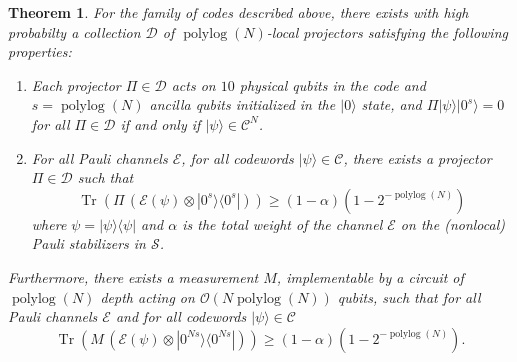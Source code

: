 \documentclass[11pt,letterpaper]{article}
\newtheorem{theorem}{Theorem}[section]
\theoremstyle{definition}
\theoremstyle{remark}
\newcommand{\Paren}[1]{\left(#1\right)}
\DeclareMathOperator{\Tr}{Tr}
\DeclareMathOperator{\polylog}{polylog}
\newcommand{\cC}{\mathcal C}
\newcommand{\cD}{\mathcal D}
\newcommand{\cE}{\mathcal E}
\newcommand{\cS}{\mathcal S}
\renewcommand{\geq}{\geqslant}
\numberwithin{equation}{section}
\theoremstyle{definition}
\newcommand{\ket}[1]{|#1\rangle}
\newcommand{\ketbra}[2]{|#1\rangle\! \langle #2|}
\begin{document}
\begin{theorem}
\label{thm:local_detection}
  For the family of codes described above, there exists with high probabilty a collection $\cD$ of $\polylog(N)$-local projectors satisfying the following properties:
  \begin{enumerate}
    \item Each projector $\Pi \in \cD$ acts on $10$ physical qubits in the code and $s = \polylog(N)$ ancilla qubits initialized in the $\ket{0}$ state, and $\Pi \ket{\psi} \ket{0^s} = 0$ for all $\Pi \in \cD$ if and only if $\ket{\psi} \in \mathcal{C}^N$.
    \item For all Pauli channels $\cE$, for all codewords $\ket{\psi} \in \cC$, there exists a projector $\Pi \in \cD$ such that
    \begin{equation}
      \Tr \Paren{\Pi \, \Paren{\cE(\psi) \otimes \ketbra{0^s}{0^s}} } \geq (1 - \alpha)(1 - 2^{-\polylog(N)})
    \end{equation}
    where $\psi = \ketbra{\psi}{\psi}$ and $\alpha$ is the total weight of the channel $\cE$ on the (nonlocal) Pauli stabilizers in $\cS$. %
    \end{enumerate}
    Furthermore, there exists a measurement $M$, implementable by a circuit of $\polylog(N)$ depth acting on $\mathcal{O}(N \polylog(N))$ qubits, such that for all Pauli channels $\cE$ and for all codewords $\ket{\psi} \in \cC$
    \begin{equation}
      \Tr \Paren{ M \, \Paren{ \cE(\psi) \otimes \ketbra{0^{Ns}}{0^{Ns}} }} \geq (1 - \alpha) (1 - 2^{-\polylog(N)}).
    \end{equation}
\end{theorem}
\end{document}
